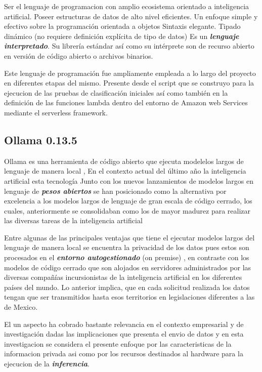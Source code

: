 Ser el lenguaje de programacion con amplio ecosistema orientado a inteligencia artificial.
Poseer estructuras de datos de alto nivel eficientes.
Un enfoque simple y efectivo sobre la programación orientada a objetos
Sintaxis elegante.
Tipado dinámico (no requiere definición explícita de tipo de datos)
Es un \textbf{\textit{lenguaje interpretado}}.
Su librería estándar así como su intérprete son de recurso abierto en versión de código abierto o archivos binarios.\cite{python_tutorial_314}

Este lenguaje de programación fue ampliamente empleada a lo largo del proyecto en diferentes etapas del mismo. Presente desde el script que se construyo para la ejecucion de las  pruebas de clasificación iniciales así como también en la definición de las funciones lambda dentro del entorno de Amazon web Services mediante el serverless framework.

\subsection{Ollama 0.13.5}

Ollama es una herramienta de código abierto que ejecuta modelelos largos de lenguaje de manera local \cite{hostingerOllama2025}, En el contexto actual del último año la inteligencia artificial esta tecnología Junto con los nuevos lanzamientos de modelos largos en lenguaje de \textbf{\textit{pesos abiertos}} se han posicionado como la alternativa por excelencia a los modelos largos de lenguaje de gran escala de código cerrado, los cuales, anteriormente se consolidaban como los de mayor madurez para realizar las diversas tareas de la inteligencia artificial 

Entre algunas de las principales ventajas que tiene el ejecutar modelos largos del lenguaje de manera local se encuentra la privacidad de los datos pues estos son procesados en el \textbf{\textit{entorno autogestionado}} (on premise) \cite{hostingerOllama2025}, en contraste con los modelos de código cerrado que son alojados en servidores administrados por las diversas compañías incursionistas de la inteligencia artificial en los diferentes países del mundo. Lo anterior implica, que en cada solicitud realizada los datos tengan que ser transmitidos hasta esos territorios en legislaciones diferentes a las de Mexico. 

El un aspecto ha cobrado bastante relevancia en el contexto empresarial y de investigación dadas las implicaciones que presenta el envio de datos y en esta investigacion se considera el presente enfoque por las caracteristicas de la informacion privada asi como por los recursos destinados al hardware para la ejecucion de la \textbf{\textit{inferencia}}. 

